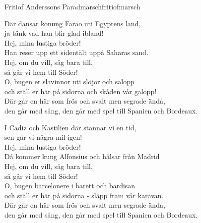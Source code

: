 \begin{song}{Fritiof Anderssons Paradmarsch}{fritiofmarsch}
\begin{vers}
Där dansar konung Farao uti Egyptens land,\\
ja tänk vad han blir glad ibland!\\
Hej, mina lustiga bröder!\\
Han reser upp ett sidentält uppå Saharas sand.\\
Hej, om du vill, säg bara till,\\
så går vi hem till Söder!\\
O, bugen er slavinnor uti slöjor och salopp\\
och ställ er här på sidorna och skåden vår galopp!\\
Där går en här som frös och svalt men segrade ändå,\\
den går med sång, den går med spel till Spanien och Bordeaux.\\
\end{vers}
\begin{vers}
I Cadiz och Kastilien där stannar vi en tid,\\
sen går vi några mil igen!\\
Hej, mina lustiga bröder!\\
Då kommer kung Alfonsius och hälsar från Madrid\\
Hej, om du vill, säg bara till,\\
så går vi hem till Söder!\\
O, bugen barcelonere i barett och bardisan\\
och ställ er här på sidorna - släpp fram vår karavan.\\
Där går en här som frös och svalt men segrade ändå,\\
den går med sång, den går med spel till Spanien och Bordeaux.\\
\end{vers}

\newp


\end{song}
